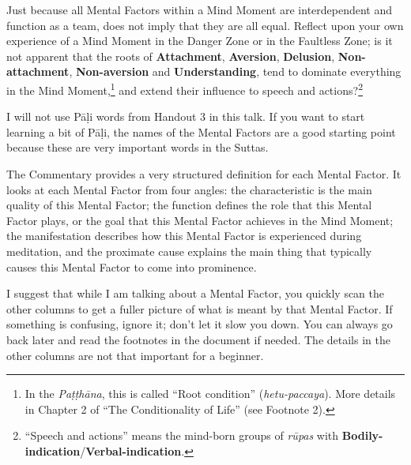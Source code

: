 Just because all Mental Factors within a Mind Moment are interdependent and function as a team, does not imply that they are all equal. Reflect upon your own experience of a Mind Moment in the Danger Zone or in the Faultless Zone; is it not apparent that the roots of \textbf{Attachment}, \textbf{Aversion}, \textbf{Delusion}, \textbf{Non-attachment}, \textbf{Non-aversion} and \textbf{Understanding}, tend to dominate everything in the Mind Moment,\footnote{In the \textit{Paṭṭhāna}, this is called “Root condition” (\textit{hetu-paccaya}). More details in Chapter 2 of “The Conditionality of Life” (see Footnote 2).} and extend their influence to speech and actions?\footnote{“Speech and actions” means the mind-born groups of \textit{rūpas} with \textbf{Bodily-indication}/\textbf{Verbal-indication}.}

I will not use Pāḷi words from Handout 3 in this talk. If you want to start learning a bit of Pāḷi, the names of the Mental Factors are a good starting point because these are very important words in the Suttas.

The Commentary provides a very structured definition for each Mental Factor. It looks at each Mental Factor from four angles: the characteristic is the main quality of this Mental Factor; the function defines the role that this Mental Factor plays, or the goal that this Mental Factor achieves in the Mind Moment; the manifestation describes how this Mental Factor is experienced during meditation, and the proximate cause explains the main thing that typically causes this Mental Factor to come into prominence.

\pagebreak

I suggest that while I am talking about a Mental Factor, you quickly scan the other columns to get a fuller picture of what is meant by that Mental Factor. If something is confusing, ignore it; don’t let it slow you down. You can always go back later and read the footnotes in the document if needed. The details in the other columns are not that important for a beginner.

